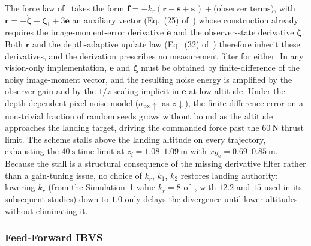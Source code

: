\documentclass[10pt,journal]{IEEEtran}
\begin{document}
The force law of~\cite{chen2025} takes the form $\boldsymbol{f} = -k_r(\boldsymbol{r}-\boldsymbol{s}+\boldsymbol{\varepsilon}) + \text{(observer terms)}$, with $\boldsymbol{r}=-\dot{\boldsymbol{\zeta}}-\boldsymbol{\zeta}_1+3\dot{\boldsymbol{e}}$ an auxiliary vector (Eq.~(25) of~\cite{chen2025}) whose construction already requires the image-moment-error derivative $\dot{\boldsymbol{e}}$ and the observer-state derivative $\dot{\boldsymbol{\zeta}}$. Both $\boldsymbol{r}$ and the depth-adaptive update law (Eq.~(32) of~\cite{chen2025}) therefore inherit these derivatives, and the derivation prescribes no measurement filter for either. In any vision-only implementation, $\dot{\boldsymbol{e}}$ and $\dot{\boldsymbol{\zeta}}$ must be obtained by finite-difference of the noisy image-moment vector, and the resulting noise energy is amplified by the observer gain and by the $1/z$ scaling implicit in $\boldsymbol{e}$ at low altitude. Under the depth-dependent pixel noise model ($\sigma_{\text{px}}\uparrow$ as $z\downarrow$), the finite-difference error on a non-trivial fraction of random seeds grows without bound as the altitude approaches the landing target, driving the commanded force past the $60~\text{N}$ thrust limit. The scheme stalls above the landing altitude on every trajectory, exhausting the $40~\text{s}$ time limit at $z_\text{f}=1.08$--$1.09~\text{m}$ with $xy_\text{e}=0.69$--$0.85~\text{m}$. Because the stall is a structural consequence of the missing derivative filter rather than a gain-tuning issue, no choice of $k_r$, $k_1$, $k_2$ restores landing authority: lowering $k_r$ (from the Simulation~1 value $k_r=8$ of~\cite{chen2025}, with $12.2$ and $15$ used in its subsequent studies) down to $1.0$ only delays the divergence until lower altitudes without eliminating it.

\subsubsection{Feed-Forward IBVS \cite{cho2022}}
\end{document}
